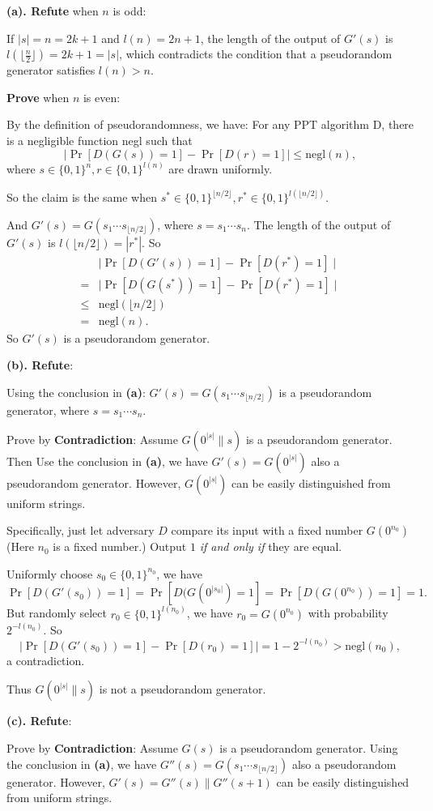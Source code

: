 \documentclass[12pt]{article}
\newcommand{\negl}{\text{negl}}
\newenvironment{problem}[2][Problem]{\begin{trivlist}
\item[\hskip \labelsep {\bfseries #1}\hskip \labelsep {\bfseries #2.}]}{\end{trivlist}}
\begin{document}
\begin{problem}{3.6}
\textbf{(a). Refute} when $n$ is odd: \par
If $|s|=n=2k+1$ and $l(n)=2n+1$, the length of the output of $G'(s)$ is $l(\lfloor\frac n2\rfloor)=2k+1=|s|$, which contradicts the condition that a pseudorandom generator satisfies $l(n)>n$.\par
\vspace{2ex}
\textbf{Prove} when $n$ is even:\par
By the definition of pseudorandomness, we have: For any PPT algorithm D, there is a negligible function negl such that
\[ \mid\Pr[D(G(s))=1]-\Pr[D(r)=1]\mid\le\negl(n), \]
where $s\in\{0,1\}^n,r\in\{0,1\}^{l(n)}$ are drawn uniformly.\par
So the claim is the same when $s^*\in\{0,1\}^{\lfloor n/2\rfloor},r^*\in\{0,1\}^{l(\lfloor n/2\rfloor)}$.\par
And $G'(s)=G(s_1\cdots s_{\lfloor n/2\rfloor})$, where $s=s_1\cdots s_n$. The length of the output of $G'(s)$ is $l(\lfloor n/2\rfloor)=|r^*|$. So 
\begin{align*}
    &\mid\Pr[D(G'(s))=1]-\Pr[D(r^*)=1]\mid\\
    =&\mid\Pr[D(G(s^*))=1]-\Pr[D(r^*)=1]\mid\\
    \le &\negl(\lfloor n/2\rfloor)\\
    =&\negl(n).
\end{align*}
So $G'(s)$ is a pseudorandom generator.\par\vspace{3ex}
\textbf{(b). Refute}: \par
Using the conclusion in \textbf{(a)}: $G'(s)=G(s_1\cdots s_{\lfloor n/2\rfloor})$ is a pseudorandom generator, where $s=s_1\cdots s_n$. \par
Prove by \textbf{Contradiction}: Assume $G(0^{|s|}\|s)$ is a pseudorandom generator. Then Use the conclusion in \textbf{(a)}, we have $G'(s)=G(0^{|s|})$ also a pseudorandom generator. However, $G(0^{|s|})$ can be easily distinguished from uniform strings. 

Specifically, just let adversary $D$ compare its input with a fixed number $G(0^{n_0})$(Here $n_0$ is a fixed number.) Output $1$ \textit{if and only if} they are equal.

Uniformly choose $s_0\in\{0,1\}^{n_0}$, we have $$\Pr[D(G'(s_0))=1]=\Pr[D(G(0^{|s_0|})=1]=\Pr[D(G(0^{n_0}))=1]=1.$$ 
But randomly select $r_0\in\{0,1\}^{l(n_0)}$, we have $r_0=G(0^{n_0})$ with probability $2^{-l(n_0)}$. So
\[\mid\Pr[D(G'(s_0))=1]-\Pr[D(r_0)=1]\mid=1-2^{-l(n_0)}>\negl(n_0),\]
a contradiction.\par
Thus $G(0^{|s|}\|s)$ is not a pseudorandom generator.\par
\vspace{3ex}
\textbf{(c). Refute}: \par
Prove by \textbf{Contradiction}: 
Assume $G(s)$ is a pseudorandom generator. 
Using the conclusion in \textbf{(a)}, we have $G''(s)=G(s_1\cdots s_{\lfloor n/2\rfloor})$ also a pseudorandom generator. 
However, $G'(s)=G''(s)\|G''(s+1)$ can be easily distinguished from uniform strings. 


\end{problem}
\end{document}
